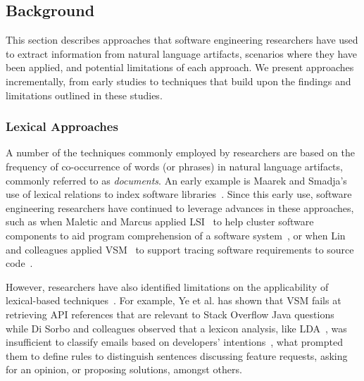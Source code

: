 
\subsection{Background}
\label{cp5:background}


This section describes approaches that software engineering researchers have used to extract information from natural language artifacts, scenarios where they have been applied, and potential limitations of each approach. We present approaches incrementally, from early studies to techniques that build upon the findings
and limitations outlined in these studies.



\subsubsection{Lexical Approaches}


A number of the techniques commonly employed by researchers are based on the
frequency of co-occurrence of words (or phrases) in natural language artifacts, commonly referred to as \textit{documents}. 
An early example is Maarek and Smadja's use of lexical relations to index
software libraries~\cite{maarek1989}. 
Since this early use, software engineering
researchers have continued to leverage advances in
these approaches, such as when 
Maletic and Marcus applied \acf{LSI}~\cite{deerwester1990LSI} to help cluster software components to aid
program comprehension of a software system~\cite{Marcus2003}, or when Lin and colleagues
applied \acf{VSM}~\cite{salton1975vector}
to support tracing software requirements to source code~\cite{Lin2021}.



However, researchers have also identified limitations on the applicability of lexical-based techniques~\cite{silva2019, Ye2016, Sorbo2015}. For example, Ye et al. has shown that \acs{VSM} 
fails at retrieving API references that are relevant to Stack Overflow Java questions~\cite{Ye2016} while
Di Sorbo and colleagues observed that a lexicon analysis, like \acs{LDA}~\cite{blei2003latent}, was insufficient to classify emails based on developers' intentions~\cite{Sorbo2015}, what prompted them 
to define rules to
distinguish sentences discussing feature requests, asking for an
opinion, or proposing solutions, amongst others.



